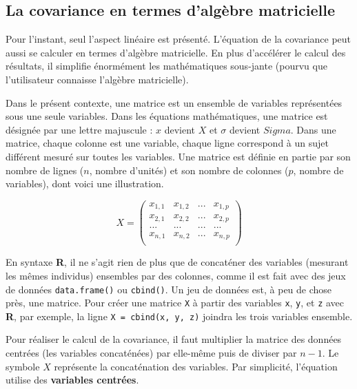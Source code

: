 \documentclass[
]{book}
\begin{document}
\hypertarget{la-covariance-en-termes-dalguxe8bre-matricielle}{%
\subsection{La covariance en termes d'algèbre matricielle}\label{la-covariance-en-termes-dalguxe8bre-matricielle}}

Pour l'instant, seul l'aspect linéaire est présenté. L'équation de la covariance peut aussi se calculer en termes d'algèbre matricielle. En plus d'accélérer le calcul des résultats, il simplifie énormément les mathématiques sous-jante (pourvu que l'utilisateur connaisse l'algèbre matricielle).

Dans le présent contexte, une matrice est un ensemble de variables représentées sous une seule variables. Dans les équations mathématiques, une matrice est désignée par une lettre majuscule : \(x\) devient \(X\) et \(\sigma\) devient \(Sigma\). Dans une matrice, chaque colonne est une variable, chaque ligne correspond à un sujet différent mesuré sur toutes les variables. Une matrice est définie en partie par son nombre de lignes (\(n\), nombre d'unités) et son nombre de colonnes (\(p\), nombre de variables), dont voici une illustration.

\[
X = \left(\begin{array}{cccc} 
x_{1,1} & x_{1,2} & ...&x_{1,p}\\
x_{2,1} & x_{2,2} & ...&x_{2,p}\\
... & ...& ...& ... \\
x_{n,1} & x_{n,2} & ... &x_{n,p}\\
\end{array}\right)
\]

En syntaxe \textbf{R}, il ne s'agit rien de plus que de concaténer des variables (mesurant les mêmes individus) ensembles par des colonnes, comme il est fait avec des jeux de données \texttt{data.frame()} ou \texttt{cbind()}. Un jeu de données est, à peu de chose près, une matrice. Pour créer une matrice \texttt{X} à partir des variables \texttt{x}, \texttt{y}, et \texttt{z} avec \textbf{R}, par exemple, la ligne \texttt{X\ =\ cbind(x,\ y,\ z)} joindra les trois variables ensemble.

Pour réaliser le calcul de la covariance, il faut multiplier la matrice des données centrées (les variables concaténées) par elle-même puis de diviser par \(n-1\). Le symbole \(X\) représente la concaténation des variables. Par simplicité, l'équation utilise des \textbf{variables centrées}.
\end{document}
